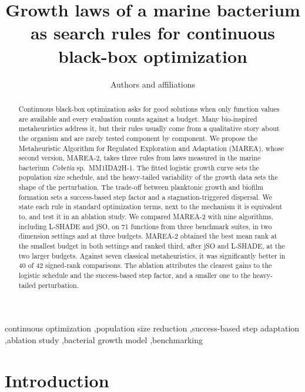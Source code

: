 \documentclass[preprint,12pt]{elsarticle}
\newcommand{\pend}[1]{\textcolor{pending}{#1}}
\newcommand{\pend}[1]{#1}
\begin{document}
\begin{frontmatter}

\title{\pend{Growth laws of a marine bacterium as search rules for continuous
black-box optimization}}

\author{\pend{Authors and affiliations}}

\begin{abstract}
Continuous black-box optimization asks for good solutions when only function
values are available and every evaluation counts against a budget. Many
bio-inspired metaheuristics address it, but their rules usually come from a
qualitative story about the organism and are rarely tested component by
component. We propose the Metaheuristic Algorithm for Regulated Exploration
and Adaptation (MAREA), whose second version, MAREA-2, takes three rules from
laws measured in the marine bacterium \emph{Cobetia} sp.\ MM1IDA2H-1. The fitted logistic growth curve sets the population size schedule, and the
heavy-tailed variability of the growth data sets the shape of the perturbation.
The trade-off between planktonic growth and biofilm formation sets a
success-based step factor and a stagnation-triggered dispersal. We state each rule in
standard optimization terms, next to the mechanism it is equivalent to, and
test it in an ablation study. We compared MAREA-2 with nine algorithms,
including L-SHADE and jSO, on 71 functions from three benchmark suites, in two
dimension settings and at three budgets. MAREA-2 obtained the best mean rank
at the smallest budget in both settings and ranked third, after jSO and
L-SHADE, at the two larger budgets. Against seven classical metaheuristics,
it was significantly better in 40 of 42 signed-rank comparisons. The ablation
attributes the clearest gains to the logistic schedule and the success-based
step factor, and a smaller one to the heavy-tailed perturbation.
\end{abstract}

\begin{keyword}
continuous optimization \sep population size reduction \sep success-based step
adaptation \sep ablation study \sep bacterial growth model \sep benchmarking
\end{keyword}

\end{frontmatter}

\section{Introduction}
\label{sec:introduction}
\end{document}
